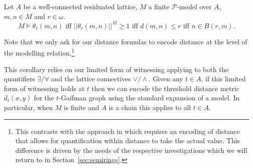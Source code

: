 \documentclass{lmcs} %
\newcommand{\?}{\ensuremath{\mkern0.4\thinmuskip}}
\newcommand{\CP}{\mathcal{P}}
\begin{document}
\begin{cor}
    Let $A$ be a well-connected residuated lattice, $M$ a finite $\CP$-model over $A$, $m,n\in M$ and $r\in\omega$. \[M\models \theta_r(m,n)\text{ iff }||\theta_r(m,n)||^M\geq 1\text{ iff }d(m,n)\leq r\text{ iff } n\in B(r,m).\] 
\end{cor}
\begin{rem}
    Note that we only ask for our distance formulas to encode distance at the level of the modelling relation.\footnote{This contrasts with the approach in \cite{BiziereGradelNaaf23:Localitysemiring} which requires an encoding of distance that allows for quantification within distance to take the actual value. This difference is driven by the needs of the respective investigations which we will return to in Section~\ref{sec:semirings}.}
\end{rem}

This corollary relies on our limited form of witnessing applying to both the quantifiers $\exists/\forall$ and the lattice connectives $\lor/\land$. Given any $t\in A$, if this limited form of witnessing holds at $t$ then we can encode the threshold distance metric $d_t(x,y)$ for the $t$-Gaifman graph using the standard expansion of a model. In particular, when $M$ is finite and $A$ is a chain this applies to all $t\in A$. 
\end{document}
